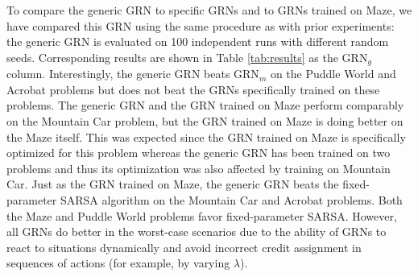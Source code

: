 To compare the generic GRN to specific GRNs and to GRNs trained on Maze, we have compared this GRN using the same procedure as with prior experiments: the generic GRN is evaluated on 100 independent runs with different random seeds. Corresponding results are shown in Table \ref{tab:results} as the GRN$_g$ column. Interestingly, the generic GRN beats GRN$_m$ on the Puddle World and Acrobat problems but does not beat the GRNs specifically trained on these problems. The generic GRN and the GRN trained on Maze perform comparably on the Mountain Car problem, but the GRN trained on Maze is doing better on the Maze itself. This was expected since the GRN trained on Maze is specifically optimized for this problem whereas the generic GRN has been trained on two problems and thus its optimization was also affected by training on Mountain Car. Just as the GRN trained on Maze, the generic GRN beats the fixed-parameter SARSA algorithm on the Mountain Car and Acrobat problems. Both the Maze and Puddle World problems favor fixed-parameter SARSA. However, all GRNs do better in the worst-case scenarios due to the ability of GRNs to react to situations dynamically and avoid incorrect credit assignment in sequences of actions (for example, by varying $\lambda$).

